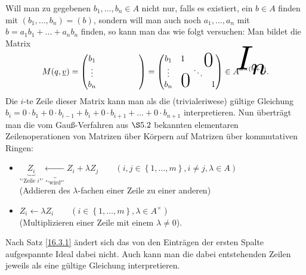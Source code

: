 \documentclass[../../main.tex]{subfiles}
\begin{document}
\noindent Will man zu gegebenen $b_1,...,b_n\in A$ nicht nur, falls es existiert, ein $b\in A$ finden mit $(b_1,...,b_n)=(b)$, sondern will man auch noch $a_1,...,a_n$ mit $b=a_1b_1+...+a_nb_n$ finden, so kann man das wie folgt versuchen: Man bildet die Matrix
\begin{align*}
M(q,\underline{v})=\begin{pmatrix*}
b_1 & & & & & \\ \vdots &  & & & & \\
b_n &  & & & & \tikz[remember picture]\node[inner sep=0pt] (b) { };
\end{pmatrix*}=
\begin{pmatrix} b_1 & 1 & \multicolumn{2}{c}{\text{\kern 1em\smash{\raisebox{-1.5ex}{\Huge 0}}}} \\ \vdots & & \ddots &  \\
b_n & \multicolumn{2}{c}{\text{\kern-1.5em\smash{\raisebox{0ex}{\Huge 0}}}} & 1
\end{pmatrix}\in A^{n\times (n+1)}.
\begin{tikzpicture}[overlay, remember picture]
\node at (b.south) [anchor=center,yshift=0.6cm, xshift=-0.7cm, scale=4] {$I_n$};
\end{tikzpicture}
\end{align*}
Die $i$-te Zeile dieser Matrix kann man als die (trivialeriwese) gültige Gleichung $b_i=0\cdot b_1+0\cdot b_{i-1}+b_i+0\cdot b_{i+1}+...+0\cdot b_{n+1}$ interpretieren. Nun überträgt man die vom Gauß-Verfahren aus $\S 5.2$ bekannten elementaren Zeilenoperationen von Matrizen über Körpern auf Matrizen über kommutativen Ringen:
\begin{itemize}
\item
$\underbrace{Z_i}_\text{"`Zeile $i$"'}\underbrace{\leftarrow}_\text{"`wird"'} Z_i+\lambda Z_j
\qquad(i,j\in \left\{1,\ldots,m\right\}, i\neq j, \lambda\in A)$\\
(Addieren des $\lambda$-fachen einer Zeile zu einer anderen)
\item
$Z_i\leftarrow \lambda Z_i\qquad(i\in\left\{1,\ldots,m\right\},\lambda\in A^\times)$\\
(Multiplizieren einer Zeile mit einem $\lambda\neq 0$).
\end{itemize}
Nach Satz \ref{16.3.1} ändert sich das von den Einträgen der ersten Spalte aufgespannte Ideal dabei nicht. Auch kann man die dabei entstehenden Zeilen jeweils als eine gültige Gleichung interpretieren.\\
\end{document}
